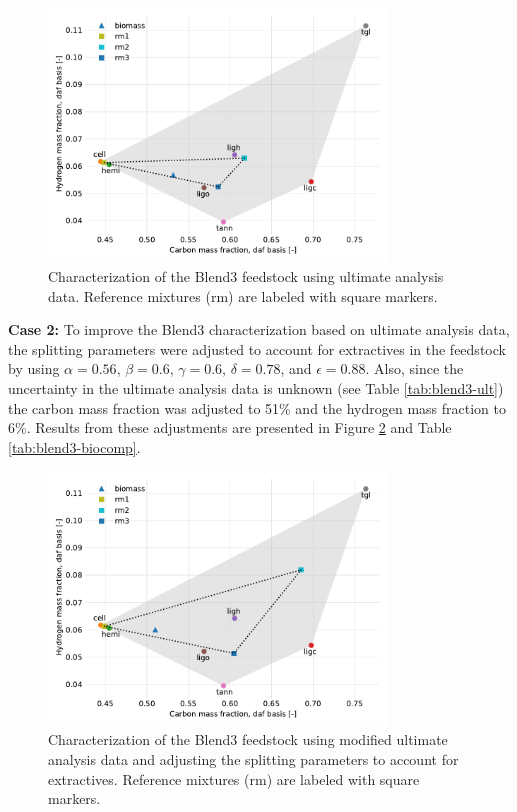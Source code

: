 \begin{figure}[H]
    \centering
    \includegraphics[width=0.8\textwidth]{figures/blend3-biocharact-ult.pdf}
    \caption{Characterization of the Blend3 feedstock using ultimate analysis data. Reference mixtures (rm) are labeled with square markers.}
    \label{fig:blend3-biocharact-ult}
\end{figure}

\textbf{Case 2:} To improve the Blend3 characterization based on ultimate analysis data, the splitting parameters were adjusted to account for extractives in the feedstock by using $\alpha = 0.56$, $\beta = 0.6$, $\gamma = 0.6$, $\delta = 0.78$, and $\epsilon = 0.88$. Also, since the uncertainty in the ultimate analysis data is unknown (see Table \ref{tab:blend3-ult}) the carbon mass fraction was adjusted to 51\% and the hydrogen mass fraction to 6\%. Results from these adjustments are presented in Figure \ref{fig:blend3-biocharact-ultmod} and Table \ref{tab:blend3-biocomp}.

\begin{figure}[H]
    \centering
    \includegraphics[width=0.8\textwidth]{figures/blend3-biocharact-ultmod.pdf}
    \caption{Characterization of the Blend3 feedstock using modified ultimate analysis data and adjusting the splitting parameters to account for extractives. Reference mixtures (rm) are labeled with square markers.}
    \label{fig:blend3-biocharact-ultmod}
\end{figure}

